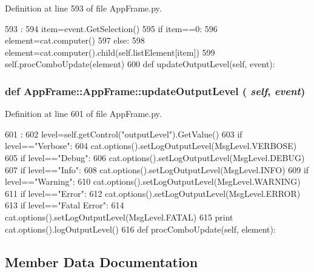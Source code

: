 Definition at line 593 of file AppFrame.py.


\begin{DoxyCode}
593                                 :
594         item=event.GetSelection()
595         if item==0:
596             element=cat.computer()
597         else:
598             element=cat.computer().child(self.listElement[item])
599         self.procComboUpdate(element)
600         
    def updateOutputLevel(self, event):
\end{DoxyCode}
\hypertarget{classAppFrame_1_1AppFrame_a6a35e9206bd5c1cedcfd8a9af7d6a8c6}{
\subsubsection[{updateOutputLevel}]{\setlength{\rightskip}{0pt plus 5cm}def AppFrame::AppFrame::updateOutputLevel ( {\em self}, \/   {\em event})}}
\label{classAppFrame_1_1AppFrame_a6a35e9206bd5c1cedcfd8a9af7d6a8c6}


Definition at line 601 of file AppFrame.py.


\begin{DoxyCode}
601                                       :
602         level=self.getControl("outputLevel").GetValue()
603         if level=="Verbose":
604             cat.options().setLogOutputLevel(MsgLevel.VERBOSE)
605         if level=="Debug":
606             cat.options().setLogOutputLevel(MsgLevel.DEBUG)            
607         if level=="Info":
608             cat.options().setLogOutputLevel(MsgLevel.INFO)
609         if level=="Warning":
610             cat.options().setLogOutputLevel(MsgLevel.WARNING)            
611         if level=="Error":
612             cat.options().setLogOutputLevel(MsgLevel.ERROR)            
613         if level=="Fatal Error":
614             cat.options().setLogOutputLevel(MsgLevel.FATAL)
615         print cat.options().logOutputLevel()
616 
    def procComboUpdate(self, element):
\end{DoxyCode}


\subsection{Member Data Documentation}
\hypertarget{classAppFrame_1_1AppFrame_a0a19a7c7e9a6095cba6813e8d13e9bec}{
\subsubsection[{cfgpanels}]{}}
\label{classAppFrame_1_1AppFrame_a0a19a7c7e9a6095cba6813e8d13e9bec}


